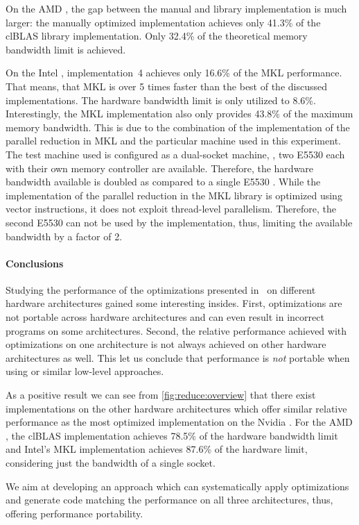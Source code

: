 On the AMD \GPU, the gap between the manual and library implementation is much larger:
the manually optimized implementation achieves only 41.3\% of the clBLAS library implementation.
Only 32.4\% of the theoretical memory bandwidth limit is achieved.

On the Intel \CPU, implementation~4 achieves only 16.6\% of the MKL performance.
That means, that MKL is over 5 times faster than the best of the discussed implementations.
The hardware bandwidth limit is only utilized to 8.6\%.
Interestingly, the MKL implementation also only provides 43.8\% of the maximum memory bandwidth.
This is due to the combination of the implementation of the parallel reduction in MKL and the particular machine used in this experiment.
The test machine used is configured as a dual-socket machine, \ie, two E5530 \CPUs each with their own memory controller are available.
Therefore, the hardware bandwidth available is doubled as compared to a single E5530 \CPU.
While the implementation of the parallel reduction in the MKL library is optimized using vector instructions, it does not exploit thread-level parallelism.
Therefore, the second E5530 \CPU can not be used by the implementation, thus, limiting the available bandwidth by a factor of 2.

\paragraph{Conclusions}
Studying the performance of the optimizations presented in~\cite{Harris2007} on different hardware architectures gained some interesting insides.
First, optimizations are not portable across hardware architectures and can even result in incorrect programs on some architectures.
Second, the relative performance achieved with optimizations on one architecture is not always achieved on other hardware architectures as well.
This let us conclude that performance is \emph{not} portable when using \OpenCL or similar low-level approaches.

As a positive result we can see from \autoref{fig:reduce:overview} that there exist implementations on the other hardware architectures which offer similar relative performance as the most optimized implementation on the Nvidia \GPU.
For the AMD \GPU, the clBLAS implementation achieves 78.5\% of the hardware bandwidth limit and Intel's MKL implementation achieves 87.6\% of the hardware limit, considering just the bandwidth of a single \CPU socket.

We aim at developing an approach which can systematically apply optimizations and generate code matching the performance on all three architectures, thus, offering performance portability.

